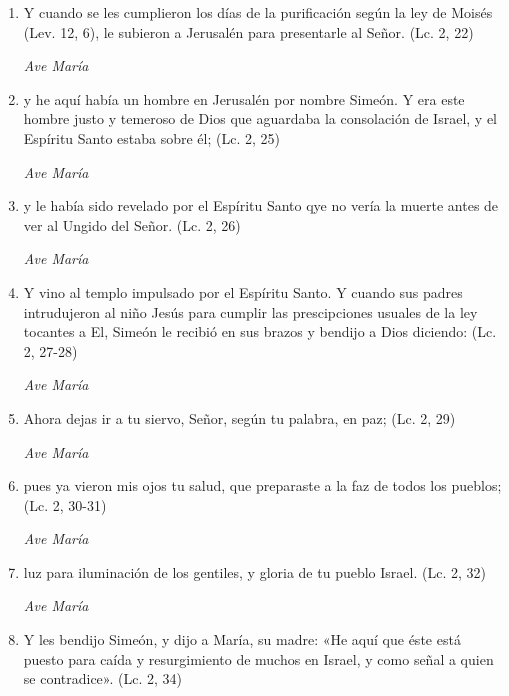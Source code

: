 \documentclass[a4paper,11pt, oneside]{report}
\begin{document}
        \begin{enumerate}
          
          \item Y cuando se les cumplieron los días de la purificación según la ley de Moisés (Lev. 12, 6), 
          le subieron a Jerusalén para presentarle al Señor. (Lc. 2, 22)
          
          \textit{Ave María}

          \item y he aquí había un hombre en Jerusalén por nombre Simeón. Y era este hombre justo y temeroso de Dios que aguardaba la consolación de Israel, 
          y el Espíritu Santo estaba sobre él; (Lc. 2, 25)
          
          \textit{Ave María}

          \item y le había sido revelado por el Espíritu Santo qye no vería la muerte antes de ver al Ungido del Señor. (Lc. 2, 26)
          
          \textit{Ave María}

          \item Y vino al templo impulsado por el Espíritu Santo. Y cuando sus padres intrudujeron al niño Jesús para cumplir las prescipciones usuales
          de la ley tocantes a El, Simeón le recibió en sus brazos y bendijo a Dios diciendo: (Lc. 2, 27-28)
          
          \textit{Ave María}

          \item Ahora dejas ir a tu siervo, Señor, según tu palabra, en paz; (Lc. 2, 29)

          \textit{Ave María}

          \item pues ya vieron mis ojos tu salud, que preparaste a la faz de todos los pueblos; (Lc. 2, 30-31)
          
          \textit{Ave María}

          \item luz para iluminación de los gentiles, y gloria de tu pueblo Israel. (Lc. 2, 32)
          
          \textit{Ave María}

          \item Y les bendijo Simeón, y dijo a María, su madre: «He aquí que éste está puesto para caída y resurgimiento de muchos en Israel, y como
          señal a quien se contradice». (Lc. 2, 34)
          

\end{enumerate}
\end{document}
